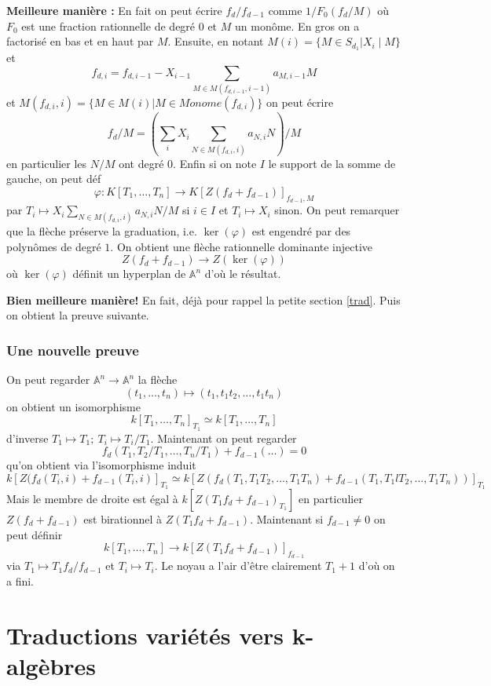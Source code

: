 \documentclass[a4paper,12pt]{book}
\newcommand{\A}{\mathbb{A}}
\theoremstyle{plain}
\theoremstyle{definition}
\theoremstyle{remark}
\begin{document}
\textbf{Meilleure manière :} En fait on peut écrire $f_d/f_{d-1}$ comme
$1/F_0(f_d/M)$ où $F_0$ est une fraction rationnelle de degré $0$ et
$M$ un monôme. En gros on a factorisé en bas et en haut par $M$. Ensuite,
en notant $M(i)=\{M\in S_{d_1}| X_i\mid M\}$ et \[f_{d,i}= f_{d,i-1}-
X_{i-1}\sum_{M\in M(f_{d,i-1},i-1)} a_{M, i-1}M\] et $M(f_{d,i},i)=\{M\in M(i)| M\in Monome(f_{d,i})\}$
on peut écrire
\[f_d/M=\left(\sum_i X_i\sum_{N\in M(f_{d,i}, i)} a_{N, i} N\right)/M\]
en particulier les $N/M$ ont degré $0$. Enfin si on note $I$ le support 
de la somme de gauche, on peut déf 
\[\varphi\colon K[T_1,\ldots,T_n]\to K[Z(f_d+f_{d-1})]_{f_{d-1}, M}\]
par $T_i\mapsto X_i\sum_{N\in M(f_{d,i}, i)} a_{N, i} N/M$ si $i\in I$
et $T_i\mapsto X_i$ sinon. On peut remarquer que la flèche préserve la 
graduation, i.e. $\ker(\varphi)$ est engendré par des polynômes de degré
$1$. On obtient une flèche rationnelle dominante injective
\[Z(f_d+f_{d-1})\to Z(\ker(\varphi))\]
où $\ker(\varphi)$ définit un hyperplan de $\A^n$ d'où le résultat.

\textbf{Bien meilleure manière!} En fait, déjà pour rappel la petite 
section \ref{trad}. Puis on obtient la preuve suivante.

\subsection{Une nouvelle preuve}
On peut regarder $\A^n\to \A^n$ la flèche 
\[(t_1,\ldots,t_n)\mapsto (t_1, t_1t_2,\ldots, t_1t_n)\]
on obtient un isomorphisme 
\[k[T_1,\ldots, T_n]_{T_1}\simeq k[T_1,\ldots, T_n]\]
d'inverse $T_1\mapsto T_1;~T_i\mapsto T_i/T_1$. Maintenant on peut 
regarder \[f_d(T_1, T_2/T_1, \ldots, T_n/T_1)+f_{d-1}(\ldots)=0\] qu'on
obtient via l'isomorphisme induit 
\[k[Z(f_d(T_i,i)+f_{d-1}(T_i,i)]_{T_1}\simeq k[Z(f_d(T_1,T_1T_2,\ldots,T_1T_n)+f_{d-1}(T_1,T_1lT_2,\ldots, T_1T_n))]_{T_1}\]
Mais le membre de droite est égal à $k[Z(T_1f_d+f_{d-1})_{T_1}]$ en
particulier $Z(f_d+f_{d-1})$ est birationnel à $Z(T_1f_d+f_{d-1})$.
Maintenant si $f_{d-1}\ne 0$ on peut définir
\[k[T_1,\ldots, T_n]\to k[Z(T_1f_d+f_{d-1})]_{f_{d-1}}\]
via $T_1\mapsto T_1f_d/f_{d-1}$ et $T_i\mapsto T_i$. Le noyau a l'air 
d'être clairement $T_1+1$ d'où on a fini.

\chapter{Traductions variétés vers k-algèbres}
\end{document}
